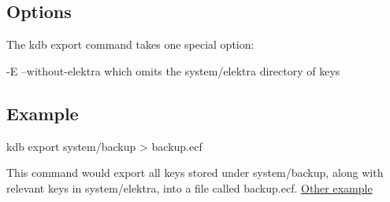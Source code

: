 \subsection*{Options}

The kdb export command takes one special option\+: \begin{DoxyVerb}    -E --without-elektra                    which omits the system/elektra directory of keys
\end{DoxyVerb}


\subsection*{Example}

\begin{DoxyVerb}    kdb export system/backup > backup.ecf
\end{DoxyVerb}


This command would export all keys stored under system/backup, along with relevant keys in system/elektra, into a file called backup.\+ecf. \hyperlink{doc_tutorials_export-dump_md}{Other example} 